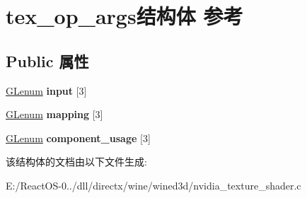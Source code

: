 \hypertarget{structtex__op__args}{}\section{tex\+\_\+op\+\_\+args结构体 参考}
\label{structtex__op__args}
\subsection*{Public 属性}
\begin{DoxyCompactItemize}
\item 
\mbox{\label{structtex__op__args_aefb3ddc29ff4e85a64178049f8dd3684}} 
\hyperlink{interfacevoid}{G\+Lenum} {\bfseries input} \mbox{[}3\mbox{]}
\item 
\mbox{\label{structtex__op__args_af7391b58be7a7b549e09a2a1a2d12a70}} 
\hyperlink{interfacevoid}{G\+Lenum} {\bfseries mapping} \mbox{[}3\mbox{]}
\item 
\mbox{\label{structtex__op__args_ac4e1cefe0f0706eeaf259b4428a8a6a5}} 
\hyperlink{interfacevoid}{G\+Lenum} {\bfseries component\+\_\+usage} \mbox{[}3\mbox{]}
\end{DoxyCompactItemize}


该结构体的文档由以下文件生成\+:\begin{DoxyCompactItemize}
\item 
E\+:/\+React\+O\+S-\/0../dll/directx/wine/wined3d/nvidia\+\_\+texture\+\_\+shader.\+c\end{DoxyCompactItemize}
